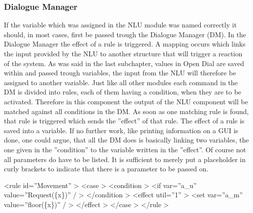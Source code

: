 \documentclass[a4paper, 12pt]{article}
\begin{document}
\subsubsection{Dialogue Manager}

If the variable which was assigned in the NLU module was named correctly it should, in most cases, first be passed trough the Dialogue Manager (DM).
In the Dialogue Manager the effect of a rule is triggered. A mapping occurs which links the input provided by the NLU to another structure that will trigger a reaction of the system.
As was said in the last subchapter, values in Open Dial are saved within and passed trough variables, the input from the NLU will therefore be assigned to another variable. \newline
Just like all other modules each command in the DM is divided into rules, each of them having a condition, when they are to be activated. 
Therefore in this component the output of the NLU component will be matched against all conditions in the DM. 
As soon as one matching rule is found, that rule is triggered which sends the ”effect” of that rule.
The effect of a rule is saved into a variable.
If no further work, like printing information on a GUI is done, one could argue, that all the DM does is basically linking two variables, the one given in the ”condition” to the variable written in the ”effect”.
Of course not all parameters do have to be listed.
It is sufficient to merely put a placeholder in curly brackets to indicate that there is a parameter to be passed on. \newline


\textless rule id=”Movement” \textgreater \newline
 \indent \indent \textless case \textgreater \newline
\indent \indent \indent \textless condition \textgreater \newline
\indent \indent \indent \indent \textless if var=”a\_u” value=”Request(\{x\})” / \textgreater \newline
 \indent \indent \indent \textless /condition \textgreater \newline
 \indent \indent \indent \textless effect util=”1” \textgreater \newline 
 \indent \indent \indent \indent \textless set var=”a\_m” value=”floor(\{x\})” / \textgreater \newline
 \indent \indent \indent \textless /effect \textgreater \newline
\indent \indent \textless /case \textgreater \newline
\indent \textless /rule \textgreater \newline
\end{document}
